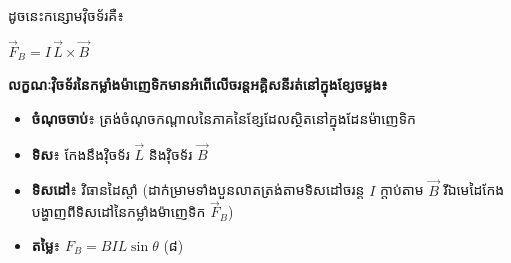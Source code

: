 \vspace{0.4em}
\noindent
ដូចនេះកន្សោមវ៉ិចទ័រគឺ៖

\vspace{0.4em}
\begin{center}
	$\vec{F}_B = I\,\vec{L}\times\vec{B}$
\end{center}

\vspace{0.7em}
\noindent
\begin{minipage}[t]{0.55\textwidth}
	\raggedright
	\textbf{លក្ខណៈវ៉ិចទ័រនៃកម្លាំងម៉ាញេទិកមានអំពើលើចរន្តអគ្គិសនីរត់នៅក្នុងខ្សែចម្លង៖}

	\vspace{0.2em}
	\begin{itemize}[itemsep=2pt, topsep=2pt, parsep=0pt, leftmargin=1.6em]
	\item \textbf{ចំណុចចាប់}៖ ត្រង់ចំណុចកណ្តាលនៃភាគនៃខ្សែដែលស្ថិតនៅក្នុងដែនម៉ាញេទិក
	\item \textbf{ទិស}៖ កែងនឹងវ៉ិចទ័រ $\vec{L}$ និងវ៉ិចទ័រ $\vec{B}$
	\item \textbf{ទិសដៅ}៖ វិធានដៃស្តាំ (ដាក់ម្រាមទាំងបួនលាតត្រង់តាមទិសដៅចរន្ត $I$ ក្តាប់តាម $\vec{B}$ រីឯមេដៃកែងបង្ហាញពីទិសដៅនៃកម្លាំងម៉ាញេទិក $\vec{F}_B$)
	\item \textbf{តម្លៃ}៖ $\boxed{F_B = BIL\sin\theta}$ \quad (៨)
	\end{itemize}
\end{minipage}%
\hfill
\begin{minipage}[t]{0.40\textwidth}
	\vspace{0pt}
	\hspace*{0.5em}%
\end{minipage}

\vspace{0.9em}
\noindent
{}


